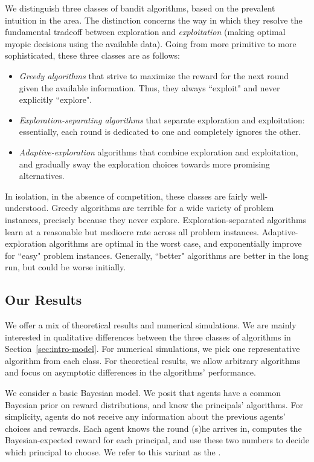 We distinguish three classes of bandit algorithms, based on
the prevalent intuition in the area. The distinction concerns the way in which they resolve the fundamental tradeoff between  exploration and \emph{exploitation} (making optimal myopic decisions using the available data). Going from more primitive to more sophisticated, these three classes are as follows:

\begin{itemize}
\item \emph{Greedy algorithms} that strive to maximize the reward for the next round given the available information. Thus, they always ``exploit" and never explicitly ``explore".


\item \emph{Exploration-separating algorithms}
 that separate exploration and exploitation: essentially, each round is dedicated to one and completely ignores the other.

\item \emph{Adaptive-exploration} algorithms that combine exploration and exploitation, and gradually sway the exploration choices towards more promising alternatives.
\end{itemize}

In isolation, \ie in the absence of competition, these classes are fairly well-understood. Greedy algorithms are terrible for a wide variety of problem instances, precisely because they never explore. Exploration-separated algorithms learn at a reasonable but mediocre rate across all problem instances. Adaptive-exploration algorithms are optimal in the worst case, and exponentially improve for ``easy" problem instances. Generally,  ``better" algorithms are better in the long run, but could be worse initially.



\subsection{Our Results}
\label{sec:intro-results}

We offer a mix of theoretical results and numerical simulations. We are mainly interested in qualitative differences between the three classes of algorithms in Section~\ref{sec:intro-model}. For numerical simulations, we pick one representative algorithm from each class. For theoretical results, we allow arbitrary algorithms and focus on asymptotic differences in the algorithms' performance.

We consider a basic Bayesian model. We posit that agents have a common Bayesian prior on reward distributions, and know the principals' algorithms. For simplicity, agents do not receive any information about the previous agents' choices and rewards. Each agent knows the round (s)he arrives in, computes the Bayesian-expected reward for each principal, and use these two numbers to decide which principal to choose. We refer to this variant as the \emph{\TheoryModel}.

